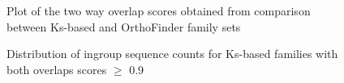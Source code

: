\documentclass{article}
\begin{document}
		\begin{figure}[h!]
			\caption{Plot of the two way overlap scores obtained from comparison between Ks-based and OrthoFinder family sets}
			\label{fig:scatter_lgf5_vs_orthofinder_overlap_lgf5}
		\end{figure}
		
		\begin{figure}[h!]
			\caption{Distribution of ingroup sequence counts for Ks-based families with both overlaps scores $\geq$ 0.9 }
			\label{fig:hist_seq_ct_lgf5_vs_orthofinder_90percent_overlap}
		\end{figure}
		
\end{document}
